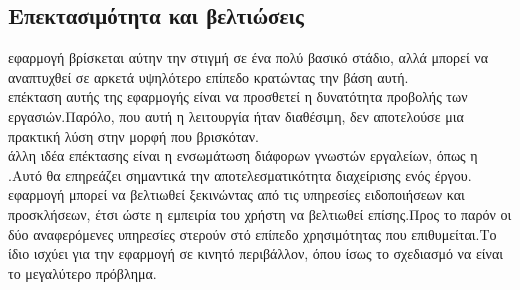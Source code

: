 \subsection*{Επεκτασιμότητα και βελτιώσεις}
 εφαρμογή βρίσκεται αύτην την στιγμή σε ένα πολύ βασικό στάδιο, αλλά μπορεί να αναπτυχθεί σε αρκετά υψηλότερο επίπεδο κρατώντας την βάση αυτή.\\
 επέκταση αυτής της εφαρμογής είναι να προσθετεί η δυνατότητα προβολής  των εργασιών.Παρόλο, που αυτή η λειτουργία ήταν διαθέσιμη, δεν αποτελούσε μια πρακτική λύση στην μορφή που βρισκόταν.\\
 άλλη ιδέα επέκτασης είναι η ενσωμάτωση διάφορων γνωστών εργαλείων, όπως  η .Αυτό θα επηρεάζει σημαντικά την αποτελεσματικότητα διαχείρισης ενός έργου.\\
 εφαρμογή μπορεί να βελτιωθεί ξεκινώντας από τις υπηρεσίες ειδοποιήσεων και προσκλήσεων, έτσι ώστε η εμπειρία του χρήστη να βελτιωθεί επίσης.Προς το παρόν οι δύο αναφερόμενες υπηρεσίες στερούν στό επίπεδο χρησιμότητας που επιθυμείται.Το ίδιο ισχύει για την εφαρμογή σε κινητό περιβάλλον, όπου ίσως το σχεδιασμό να είναι το μεγαλύτερο πρόβλημα.
